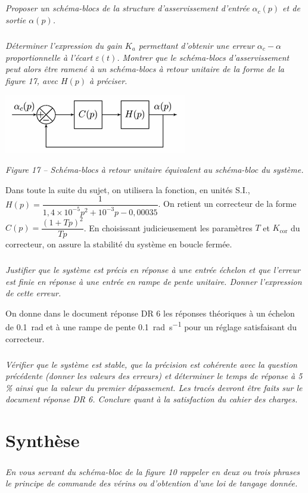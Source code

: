 \documentclass[10pt,fleqn]{article} %
\begin{document}
\subparagraph{}
\textit{Proposer un schéma-blocs de la structure d'asservissement d'entrée $\alpha_c(p)$ et de sortie $\alpha(p)$.} 

\subparagraph{}
\textit{Déterminer l'expression du gain $K_a$ permettant d'obtenir une erreur $\alpha_c-\alpha$ proportionnelle à l'écart $\varepsilon(t)$. Montrer que le schéma-blocs d'asservissement peut alors être ramené à un schéma-blocs à retour unitaire de la forme de la figure 17, avec $H(p)$ à préciser.}

\begin{center}
\includegraphics[width=.9\linewidth]{images/fig_17}

\textit{Figure 17 -- Schéma-blocs à retour unitaire équivalent au schéma-bloc du système.}
\end{center}


Dans toute la suite du sujet, on utilisera la fonction, en unités S.I.,
$ 
H(p) = \dfrac{1}{1,4 \times 10^{-5}p^2 + 10^{-3}p - 0,00035}$. 
On retient un correcteur de la forme $C(p)=\dfrac{\left(1+Tp\right)^2}{Tp}$.
En choisissant judicieusement les paramètres $T$ et $K_{\text{cor}}$ du correcteur, on assure la stabilité 
du système en boucle fermée. 

\subparagraph{}
\textit{Justifier que le système est précis en réponse à une entrée échelon et que l'erreur est finie en réponse à une entrée en rampe de pente unitaire. Donner l'expression de cette erreur.}

On donne dans le document réponse DR 6 les réponses théoriques à un échelon de \SI{0,1}{rad} et à une rampe de pente \SI{0,1}{rad.s^{-1}} pour un réglage satisfaisant du correcteur. 

\subparagraph{}
\textit{Vérifier que le système est stable, que la précision est cohérente avec la question précédente (donner les valeurs des erreurs) et déterminer le temps de réponse à 5\, \% ainsi que la valeur du premier dépassement. Les tracés devront être faits sur le document réponse DR 6. Conclure quant à la satisfaction du cahier des charges.}



\section{Synthèse}
\subparagraph{}
\textit{En vous servant du schéma-bloc de la figure 10%
rappeler en deux ou trois phrases le principe de commande des vérins ou d'obtention d'une loi de tangage donnée.}
\end{document}
